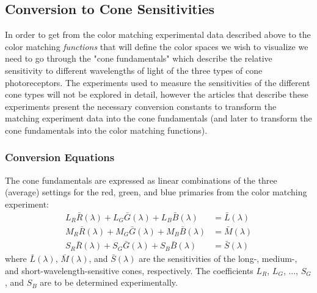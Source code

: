 \documentclass[twocolumn]{article}
\begin{document}
\subsection{Conversion to Cone Sensitivities}
In order to get from the color matching experimental data described above to the color matching \textit{functions} that will define the color spaces we wish to visualize we need to go through the "cone fundamentals" which describe the relative sensitivity to different wavelengths of light of the three types of cone photoreceptors.  The experiments used to measure the sensitivities of the different cone types will not be explored in detail, however the articles that describe these experiments present the necessary conversion constants to transform the matching experiment data into the cone fundamentals (and later to transform the cone fundamentals into the color matching functions).
\subsubsection{Conversion Equations}
The cone fundamentals are expressed as linear combinations of the three (average) settings for the red, green, and blue primaries from the color matching experiment:
\begin{equation}
    \begin{aligned}
        L_R\bar{R}(\lambda)+L_G\bar{G}(\lambda)+L_B\bar{B}(\lambda)&=\bar{L}(\lambda)\\
        M_R\bar{R}(\lambda)+M_G\bar{G}(\lambda)+M_B\bar{B}(\lambda)&=\bar{M}(\lambda)\\
        S_R\bar{R}(\lambda)+S_G\bar{G}(\lambda)+S_B\bar{B}(\lambda)&=\bar{S}(\lambda)
    \end{aligned}
\end{equation}
where $\bar{L}(\lambda)$, $\bar{M}(\lambda)$, and $\bar{S}(\lambda)$ are the sensitivities of the long-, medium-, and short-wavelength-sensitive cones, respectively.  The coefficients $L_R$, $L_G$, ..., $S_G$, and $S_B$ are to be determined experimentally.
\end{document}
